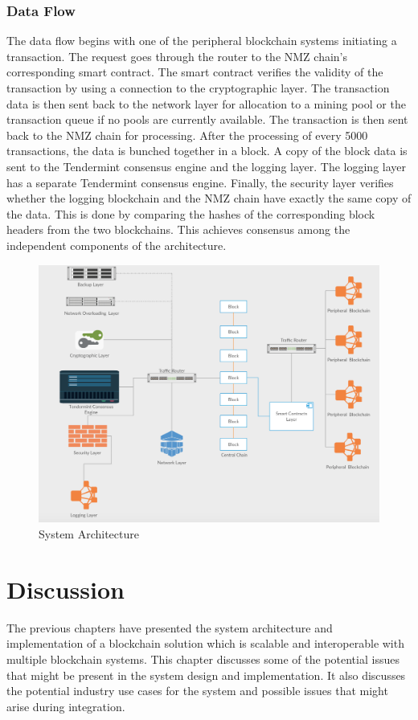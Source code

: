 \documentclass[a4paper,twoside,phd]{BYUPhys}
\begin{document}
\subsection{Data Flow}
The data flow begins with one of the peripheral blockchain systems initiating a transaction. The request goes through the router to the NMZ chain's corresponding smart contract. The smart contract verifies the validity of the transaction by using a connection to the cryptographic layer. The transaction data is then sent back to the network layer for allocation to a mining pool or the transaction queue if no pools are currently available. The transaction is then sent back to the NMZ chain for processing. After the processing of every 5000 transactions, the data is bunched together in a block. A copy of the block data is sent to the Tendermint consensus engine and the logging layer. The logging layer has a separate Tendermint consensus engine. Finally, the security layer verifies whether the logging blockchain and the NMZ chain have exactly the same copy of the data. This is done by comparing the hashes of the corresponding block headers from the two blockchains. This achieves consensus among the independent components of the architecture.
\begin{figure}
  \includegraphics[width=\linewidth]{system_overview.png}
  \caption{System Architecture}
  \label{fig:3}
\end{figure}
\chapter{Discussion}
\label{chap:Discussion}
The previous chapters have presented the system architecture and implementation of a blockchain solution which is scalable and interoperable with multiple blockchain systems. This chapter discusses some of the potential issues that might be present in the system design and implementation. It also discusses the potential industry use cases for the system and possible issues that might arise during integration.
\end{document}

